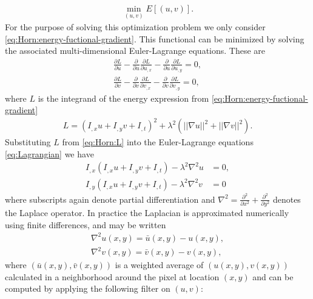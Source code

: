 \documentclass[letterpaper,11pt]{article}
\begin{document}
\begin{align}
\min_{(u,v)} E[(u,v)].
\label{eq:Horn:optimization}
\end{align}
For the purpose of solving this optimization problem we only consider \eqref{eq:Horn:energy-fuctional-gradient}. This functional can be minimized by solving the associated multi-dimensional Euler-Lagrange equations. These are
\begin{subequations}
\begin{align}
\frac{\partial L}{\partial u} - \frac{\partial}{\partial u}\frac{\partial L}{\partial u_{,x}} - \frac{\partial}{\partial u}\frac{\partial L}{\partial u_{,y}} = 0, \\
\frac{\partial L}{\partial v} - \frac{\partial}{\partial v}\frac{\partial L}{\partial v_{,x}} - \frac{\partial}{\partial v}\frac{\partial L}{\partial v_{,y}} = 0, 
\end{align}
\label{eq:Lagrangian}
\end{subequations}
where $L$ is the integrand of the energy expression from \eqref{eq:Horn:energy-fuctional-gradient}
\begin{align}
L = (I_{,x} u + I_{,y} v + I_{,t})^2 + \lambda^2 ( || \nabla u ||^2 + ||\nabla v|| ^2 ).
\label{eq:Horn:L}
\end{align}
Substituting $L$ from \eqref{eq:Horn:L} into the Euler-Lagrange equations \eqref{eq:Lagrangian} we have
\begin{subequations}
\begin{align}
I_{,x} (I_{,x} u + I_{,y} v + I_{,t}) - \lambda^2 \nabla^2 u &= 0, \\
I_{,y} (I_{,x} u + I_{,y} v + I_{,t}) - \lambda^2 \nabla^2 v &= 0
\end{align}
\label{eq:Horn:Lagrangian}
\end{subequations}
where subscripts again denote partial differentiation and $\nabla^2 = \frac{\partial^2}{\partial x^2} + \frac{\partial^2}{\partial y^2}$ denotes the Laplace operator. In practice the Laplacian is approximated numerically using finite differences, and may be written
\begin{subequations}
\begin{align}
\nabla^2 u(x,y) = \bar{u} (x,y) - u(x,y),\\
\nabla^2 v(x,y) = \bar{v} (x,y) - v(x,y),
\end{align}
\label{eq:laplace-difference-approximation}
\end{subequations}
where $(\bar{u}(x,y),\bar{v}(x,y))$ is a weighted average of $(u(x,y),v(x,y))$ calculated in a neighborhood around the pixel at location $(x,y)$ and can be computed by applying the following filter on $(u,v)$:
\end{document}
